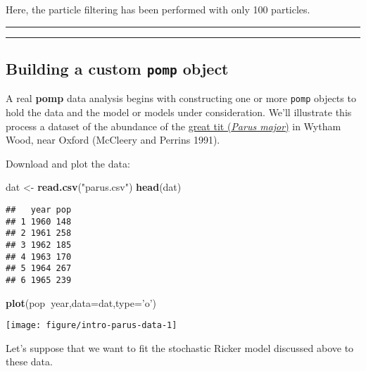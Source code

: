 \documentclass[]{article}
\newenvironment{Shaded}{\begin{snugshade}}{\end{snugshade}}
\newcommand{\KeywordTok}[1]{\textcolor[rgb]{0.13,0.29,0.53}{\textbf{#1}}}
\newcommand{\DataTypeTok}[1]{\textcolor[rgb]{0.13,0.29,0.53}{#1}}
\newcommand{\StringTok}[1]{\textcolor[rgb]{0.31,0.60,0.02}{#1}}
\newcommand{\OperatorTok}[1]{\textcolor[rgb]{0.81,0.36,0.00}{\textbf{#1}}}
\newcommand{\NormalTok}[1]{#1}
\begin{document}
Here, the particle filtering has been performed with only 100 particles.

\begin{center}\rule{0.5\linewidth}{\linethickness}\end{center}

\begin{center}\rule{0.5\linewidth}{\linethickness}\end{center}

\subsection{\texorpdfstring{Building a custom \texttt{pomp}
object}{Building a custom pomp object}}\label{building-a-custom-pomp-object}

A real \textbf{pomp} data analysis begins with constructing one or more
\texttt{pomp} objects to hold the data and the model or models under
consideration. We'll illustrate this process a dataset of the abundance
of the \href{https://en.wikipedia.org/wiki/Great_tit}{great tit
(\emph{Parus major})} in Wytham Wood, near Oxford (McCleery and Perrins
1991).

Download and plot the data:

\begin{Shaded}
\begin{Highlighting}[]
\NormalTok{dat <-}\StringTok{ }\KeywordTok{read.csv}\NormalTok{(}\StringTok{"parus.csv"}\NormalTok{)}
\KeywordTok{head}\NormalTok{(dat)}
\end{Highlighting}
\end{Shaded}

\begin{verbatim}
##   year pop
## 1 1960 148
## 2 1961 258
## 3 1962 185
## 4 1963 170
## 5 1964 267
## 6 1965 239
\end{verbatim}

\begin{Shaded}
\begin{Highlighting}[]
\KeywordTok{plot}\NormalTok{(pop}\OperatorTok{~}\NormalTok{year,}\DataTypeTok{data=}\NormalTok{dat,}\DataTypeTok{type=}\StringTok{'o'}\NormalTok{)}
\end{Highlighting}
\end{Shaded}

\begin{center}\texttt{[image: figure/intro-parus-data-1]} \end{center}

Let's suppose that we want to fit the stochastic Ricker model discussed
above to these data.
\end{document}

